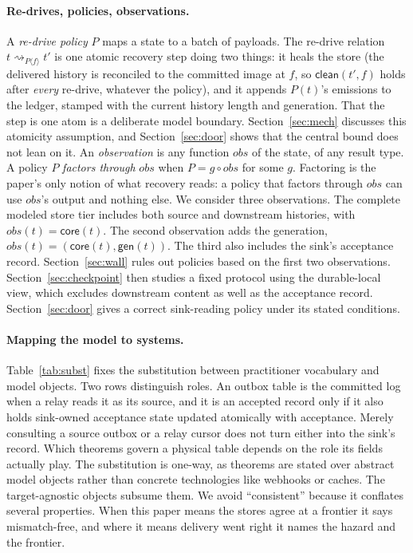 \documentclass[sigplan,10pt]{acmart}
\theoremstyle{plain}
\theoremstyle{definition}
\newcommand{\corein}{\mathsf{core}}        %
\newcommand{\gen}{\mathsf{gen}}            %
\newcommand{\clean}{\mathsf{clean}}        %
\newcommand{\rdrto}[2]{\mathrel{\rightsquigarrow_{#1\langle #2\rangle}}} %
\begin{document}
\paragraph{Re-drives, policies, observations.}
A \emph{re-drive policy} $P$ maps a state to a batch of payloads. The
re-drive relation $t \rdrto{P}{f} t'$ is one atomic recovery step doing
two things: it heals the store (the delivered history is reconciled to
the committed image at $f$, so $\clean(t',f)$ holds after \emph{every}
re-drive, whatever the policy), and it appends $P(t)$'s emissions to
the ledger, stamped with the current history length and generation.
That the step is one atom is a deliberate model boundary.
Section~\ref{sec:mech} discusses this atomicity assumption, and
Section~\ref{sec:door} shows that the central bound does not lean on
it. An \emph{observation} is any function $\mathit{obs}$ of the state,
of any result type. A policy $P$ \emph{factors through} $\mathit{obs}$ when
$P = g \circ \mathit{obs}$ for some $g$. Factoring is the paper's only
notion of what recovery reads: a policy that factors through
$\mathit{obs}$ can use $\mathit{obs}$'s output and nothing else. We consider three observations. The complete modeled store tier includes
both source and downstream histories, with
$\mathit{obs}(t) = \corein(t)$. The second observation adds the
generation, $\mathit{obs}(t) = (\corein(t), \gen(t))$. The third also
includes the sink's acceptance record. Section~\ref{sec:wall} rules
out policies based on the first two observations. Section~\ref{sec:checkpoint}
then studies a fixed protocol using the durable-local view, which
excludes downstream content as well as the acceptance record.
Section~\ref{sec:door} gives a correct sink-reading policy under its
stated conditions.

\paragraph{Mapping the model to systems.}
Table~\ref{tab:subst} fixes the substitution between practitioner
vocabulary and model objects. Two rows distinguish roles. An outbox
table is the committed log when a relay reads it
as its source, and it is an accepted record only if it also holds
sink-owned acceptance state updated atomically with acceptance. Merely
consulting a source outbox or a relay cursor does not turn either into
the sink's record. Which theorems govern a physical table depends on
the role its fields actually play. The substitution is one-way,
as theorems are stated over abstract model objects rather than concrete
technologies like webhooks or caches. The target-agnostic
objects subsume them. We avoid ``consistent'' because it conflates
several properties. When this paper means the stores agree at a
frontier it says mismatch-free, and
where it means delivery went right it names the hazard and the
frontier.
\end{document}
